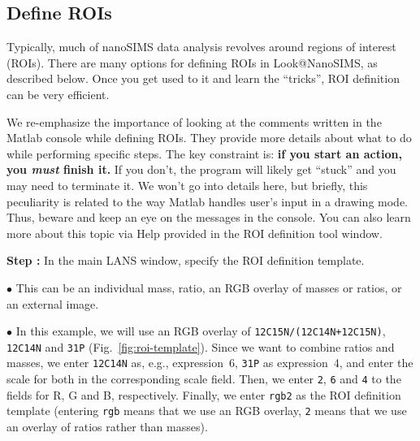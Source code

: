 \documentclass[a4paper, 11pt]{article}
\newcommand{\ttt}[1]{\texttt{#1}}
\newcommand{\lans}[1]{{\color{magenta}#1}}
\newcommand{\lanstf}[1]{{\color{cyan}#1}}
\newcounter{step}
\newcommand\s{\addtocounter{step}{1}\vskip5pt\noindent\textbf{Step \thestep:}{ }}
\newcommand\bul{\vskip5pt\noindent$\bullet${ }}
\newcommand\bb[1]{\textbf{#1}}
\begin{document}
\subsection{Define ROIs}
\setcounter{step}{0}

Typically, much of nanoSIMS data analysis revolves around regions of interest (ROIs). There are many options for defining ROIs in Look@NanoSIMS, as described below. Once you get used to it and learn the ``tricks'', ROI definition can be very efficient. 

We re-emphasize the importance of looking at the comments written in the Matlab console while defining ROIs. They provide more details about what to do while performing specific steps. The key constraint is: \bb{if you start an action, you \emph{must} finish it.} If you don't, the program will likely get ``stuck'' and you may need to terminate it. We won't go into details here, but briefly, this peculiarity is related to the way Matlab handles user's input in a drawing mode. Thus, beware and keep an eye on the messages in the console. You can also learn more about this topic via \lans{Help} provided in the ROI definition tool window.

\s In the main LANS window, specify the \lanstf{ROI definition template}. 

\bul This can be an individual mass, ratio, an RGB overlay of masses or ratios, or an external image.

\bul In this example, we will use an RGB overlay of \ttt{12C15N/(12C14N+12C15N)}, \ttt{12C14N} and \ttt{31P} (Fig.~\ref{fig:roi-template}). Since we want to combine ratios and masses, we enter \ttt{12C14N} as, e.g., expression~6, \ttt{31P} as expression~4, and enter the scale for both in the corresponding \lanstf{scale} field. Then, we enter \ttt{2}, \ttt{6} and \ttt{4} to the fields for \lanstf{R}, \lanstf{G} and \lanstf{B}, respectively. Finally, we enter \ttt{rgb2} as the \lanstf{ROI definition template} (entering \ttt{rgb} means that we use an RGB overlay, \ttt{2} means that we use an overlay of ratios rather than masses).
\end{document}
